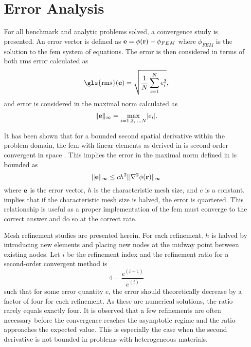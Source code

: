 \section{Error Analysis}
  For all benchmark and analytic problems solved, a convergence study is 
  presented. An error vector is defined as $\mathbf{e} = \phi(\mathbf{r}) - \phi_{FEM}$ where
  $\phi_{FEM}$ is the solution to the \gls{fem} system of equations. 
  The error is then considered in terms of both \gls{rms} error calculated as 
  \begin{equation} 
    \label{eq:rms}
    \text{\gls{rms}}(\ve) = \sqrt{\frac{1}{N} \sum_{i=1}^{N} e_i^2},
  \end{equation}
  and error is considered in the maximal norm calculated as
  \begin{equation} 
    \label{eq:infnorm}
    \|\mathbf{e}\|_{\infty} = \max_{i=1,2,\ldots,N} \lvert e_i \rvert.
  \end{equation}

  It has been shown that for a bounded second spatial derivative 
  within the problem domain, the \gls{fem} with linear elements as derived in 
   is second-order convergent in space 
  \cite{textbookli}. This implies the error in the maximal norm defined in 
   is bounded as
  \begin{equation} 
    \label{eq:error_bound}
    \|\mathbf{e}\|_{\infty} \le c h^2 \| \mathbf{\nabla}^2 \phi(\mathbf{r}) \|_{\infty}
  \end{equation}
  where $\mathbf{e}$ is the error vector, $h$ is the characteristic mesh size, and $c$
  is a constant.  implies that if the characteristic mesh 
  size is halved, the error is quartered. This relationship is useful as a 
  proper implementation of the \gls{fem} must converge to the correct answer and 
  do so at the correct rate.
  
  Mesh refinement studies are presented herein. For each refinement, $h$ is 
  halved by introducing new elements and placing new nodes at the midway point
  between existing nodes. Let $i$ be the refinement index and the refinement 
  ratio for a second-order convergent method is 
  \begin{equation}
    4 = \frac{e^{(i-1)}}{e^{(i)}}
  \end{equation}
  such that for some error quantity $e$, the error should theoretically decrease 
  by a factor of four for each refinement. As these are numerical solutions, the
  ratio rarely equals exactly four. It is observed that a few refinements are
  often necessary before the convergence reaches the asymptotic regime and the
  ratio approaches the expected value. This is especially the case when the
  second derivative is not bounded in problems with heterogeneous materials.
  
